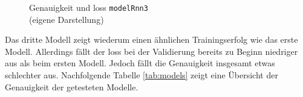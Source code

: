 \documentclass[
    12pt, %
    DIV10,
    ngerman, %
    a4paper, %
    oneside, %
    titlepage, %
    parskip=half, %
    headings=normal, %
    listof=totoc, %
    bibliography=totoc, %
    index=totoc, %
    captions=tableheading, %
    final %
]{scrreprt}
\begin{document}
\begin{figure}[H]
\caption{Genauigkeit und loss \texttt{modelRnn3}\\(eigene Darstellung)}\label{fig:rnn3}
\end{figure}
Das dritte Modell zeigt wiederum einen ähnlichen Trainingserfolg wie das erste Modell. Allerdings fällt der loss bei der Validierung bereits zu Beginn niedriger aus als beim ersten Modell. Jedoch fällt die Genauigkeit insgesamt etwas schlechter aus. Nachfolgende Tabelle \ref{tab:models} zeigt eine Übersicht der  Genauigkeit der getesteten Modelle.
\end{document}
